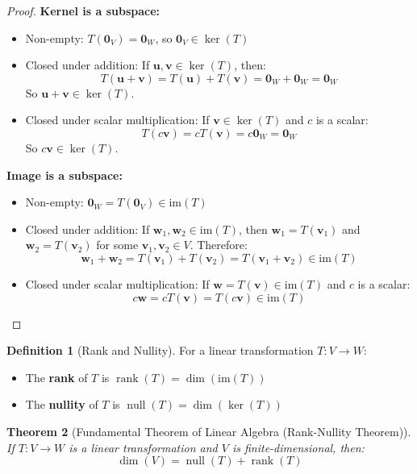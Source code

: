 \documentclass[12pt]{article}
\numberwithin{equation}{section}
\newcommand{\vect}[1]{\boldsymbol{#1}}   %
\newcommand{\rank}{\operatorname{rank}}
\newcommand{\nullity}{\operatorname{null}}
\theoremstyle{plain}
\newtheorem{theorem}{Theorem}[section]
\theoremstyle{definition}
\newtheorem{definition}[theorem]{Definition}
\theoremstyle{remark}
\begin{document}
\begin{proof}
\textbf{Kernel is a subspace:}
\begin{itemize}
\item Non-empty: $T(\vect{0}_V) = \vect{0}_W$, so $\vect{0}_V \in \ker(T)$
\item Closed under addition: If $\vect{u}, \vect{v} \in \ker(T)$, then:
$$T(\vect{u} + \vect{v}) = T(\vect{u}) + T(\vect{v}) = \vect{0}_W + \vect{0}_W = \vect{0}_W$$
So $\vect{u} + \vect{v} \in \ker(T)$.
\item Closed under scalar multiplication: If $\vect{v} \in \ker(T)$ and $c$ is a scalar:
$$T(c\vect{v}) = cT(\vect{v}) = c\vect{0}_W = \vect{0}_W$$
So $c\vect{v} \in \ker(T)$.
\end{itemize}

\textbf{Image is a subspace:}
\begin{itemize}
\item Non-empty: $\vect{0}_W = T(\vect{0}_V) \in \text{im}(T)$
\item Closed under addition: If $\vect{w}_1, \vect{w}_2 \in \text{im}(T)$, then $\vect{w}_1 = T(\vect{v}_1)$ and $\vect{w}_2 = T(\vect{v}_2)$ for some $\vect{v}_1, \vect{v}_2 \in V$. Therefore:
$$\vect{w}_1 + \vect{w}_2 = T(\vect{v}_1) + T(\vect{v}_2) = T(\vect{v}_1 + \vect{v}_2) \in \text{im}(T)$$
\item Closed under scalar multiplication: If $\vect{w} = T(\vect{v}) \in \text{im}(T)$ and $c$ is a scalar:
$$c\vect{w} = cT(\vect{v}) = T(c\vect{v}) \in \text{im}(T)$$
\end{itemize}
\end{proof}

\begin{definition}[Rank and Nullity]
For a linear transformation $T: V \to W$:
\begin{itemize}
\item The \textbf{rank} of $T$ is $\rank(T) = \dim(\text{im}(T))$
\item The \textbf{nullity} of $T$ is $\nullity(T) = \dim(\ker(T))$
\end{itemize}
\end{definition}

\begin{theorem}[Fundamental Theorem of Linear Algebra (Rank-Nullity Theorem)]
If $T: V \to W$ is a linear transformation and $V$ is finite-dimensional, then:
$$\dim(V) = \nullity(T) + \rank(T)$$
\end{theorem}
\end{document}
